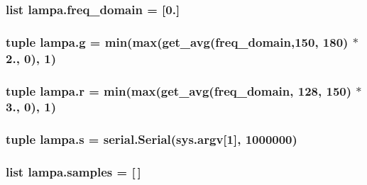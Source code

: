 \subsubsection[{freq\+\_\+domain}]{\setlength{\rightskip}{0pt plus 5cm}list lampa.\+freq\+\_\+domain = \mbox{[}0.\mbox{]}}\label{namespacelampa_a0023f9bb1a443d88bfc1ceae37d86a2d}
\hypertarget{namespacelampa_aaba00d880a609d8039d179c4501f6efb}{}
\subsubsection[{g}]{\setlength{\rightskip}{0pt plus 5cm}tuple lampa.\+g = min(max({\bf get\+\_\+avg}({\bf freq\+\_\+domain},150, 180) $\ast$ 2., 0), 1)}\label{namespacelampa_aaba00d880a609d8039d179c4501f6efb}
\hypertarget{namespacelampa_a33feca73448b5b010b10a585af4dc6ba}{}
\subsubsection[{r}]{\setlength{\rightskip}{0pt plus 5cm}tuple lampa.\+r = min(max({\bf get\+\_\+avg}({\bf freq\+\_\+domain}, 128, 150) $\ast$ 3., 0), 1)}\label{namespacelampa_a33feca73448b5b010b10a585af4dc6ba}
\hypertarget{namespacelampa_af6cd9afef9d5497a7d3f29f01c0b35fc}{}
\subsubsection[{s}]{\setlength{\rightskip}{0pt plus 5cm}tuple lampa.\+s = serial.\+Serial(sys.\+argv\mbox{[}1\mbox{]}, 1000000)}\label{namespacelampa_af6cd9afef9d5497a7d3f29f01c0b35fc}
\hypertarget{namespacelampa_a1a7945b56fddcb39fd7cebfcbde049d4}{}
\subsubsection[{samples}]{\setlength{\rightskip}{0pt plus 5cm}list lampa.\+samples = \mbox{[}$\,$\mbox{]}}\label{namespacelampa_a1a7945b56fddcb39fd7cebfcbde049d4}
